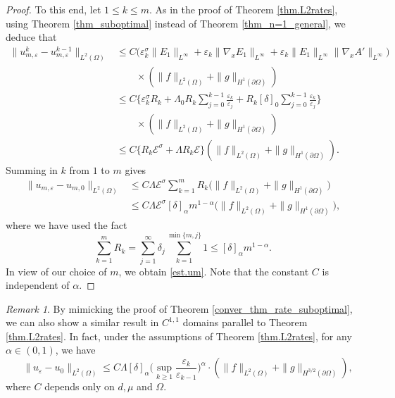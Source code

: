 \documentclass[reqno,12pt]{amsart} %
\theoremstyle{definition}
\theoremstyle{remark}
\newtheorem{remark}[theorem]{Remark}
\numberwithin{equation}{section}
\begin{document}
\begin{proof}
    To this end, let $1\le k \le m$. As in the proof of Theorem \ref{thm.L2rates}, using Theorem \ref{thm_suboptimal} instead of Theorem \ref{thm_n=1_general}, we deduce that 
    \begin{align*}
        \|u_{m, \varepsilon}^k-u_{m, \varepsilon}^{k-1}\|_{L^2(\Omega)} & \leq C\big(\varepsilon_k^{\sigma}\|E_1\|_{L^\infty}+\varepsilon_k\|\nabla_x E_1\|_{L^\infty}+\varepsilon_k\|E_1\|_{L^\infty}\|\nabla_xA'\|_{L^\infty}\big) \\
        &\qquad\times (\|f\|_{L^2(\Omega)}+\|g\|_{H^1(\partial\Omega)})\\&\leq C\bigg\{\varepsilon_k^\sigma R_k+\Lambda_0R_k\sum_{j=0}^{k-1}\frac{\varepsilon_k}{\varepsilon_j}+R_k[\delta]_0\sum_{j=0}^{k-1}\frac{\varepsilon_k}{\varepsilon_j}\bigg\}\\
        &\qquad \times (\|f\|_{L^2(\Omega)}+\|g\|_{H^1(\partial\Omega)})\\&\leq C\big\{ R_k \mathcal{E}^\sigma+\Lambda R_k \mathcal{E} \big\} (\|f\|_{L^2(\Omega)}+\|g\|_{H^1(\partial\Omega)}).
\end{align*}
Summing in $k$ from $1$ to $m$ gives
\begin{align*}
  \|u_{m, \varepsilon}-u_{m, 0}\|_{L^2(\Omega)} & \leq C\Lambda \mathcal{E}^\sigma \sum_{k=1}^m R_k \Big(\|f\|_{L^2(\Omega)}+\|g\|_{H^1(\partial\Omega)}\Big)\\
  & \leq C \Lambda \mathcal{E}^\sigma [\delta]_\alpha m^{1-\alpha} \big(\|f\|_{L^2(\Omega)}+\|g\|_{H^1(\partial\Omega)}\big),
\end{align*}
where we have used the fact
\begin{equation*}
    \sum_{k=1}^m R_k = \sum_{j = 1}^\infty \delta_j \sum_{k=1}^{\min\{m, j \}} 1 \le [\delta]_\alpha m^{1-\alpha}.
\end{equation*}
In view of our choice of $m$, we obtain \eqref{est.um}. Note that the constant $C$ is independent of $\alpha$.
\end{proof}

\begin{remark}
    By mimicking the proof of Theorem \ref{conver_thm_rate_suboptimal}, we can also show a similar result in $C^{1,1}$ domains parallel to Theorem \ref{thm.L2rates}. In fact, under the assumptions of Theorem \ref{thm.L2rates}, for any $\alpha \in (0,1)$, we have
    \begin{equation*}
        \quad \|u_\varepsilon-u_0\|_{L^2(\Omega)}\leq C\Lambda [\delta]_\alpha \bigg( \sup_{k\geq 1} \frac{\varepsilon_k}{\varepsilon_{k-1}} \bigg)^\alpha \cdot(\|f\|_{L^2(\Omega)}+\|g\|_{H^{3/2}(\partial\Omega)}),
    \end{equation*}
    where $C$ depends only on $d, \mu$ and $\Omega$.
\end{remark}
\end{document}
